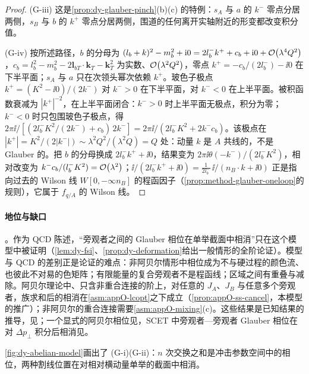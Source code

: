 \begin{proof}
(G-iii) 这是\cref{prop:dy-glauber-pinch}(b)(c) 的特例：$s_A$ 与 $a$ 的 $k^-$ 零点分居两侧，$s_B$ 与 $b$ 的 $k^+$ 零点分居两侧，围道的任何离开实轴附近的形变都改变积分值。

(G-iv) 按所述路径，$b$ 的分母为 $(l_b+k)^2-m_b^2+\mathrm{i}0=2l_b^-k^++c_b+\mathrm{i}0+\mathcal{O}\!\left(\lambda^4Q^2\right)$，$c_b=l_b^2-m_b^2-2\mathbf l_{bT}\cdot\mathbf k_T-\mathbf k_T^2$ 为实数、$\mathcal{O}\!\left(\lambda^2Q^2\right)$，零点 $k^+=-c_b/(2l_b^-)-\ii0$ 在下半平面；$s_A$ 与 $a$ 只在次领头幂次依赖 $k^+$。玻色子极点 $k^+=(K^2-\ii0)/(2k^-)$ 对 $k^->0$ 在下半平面，对 $k^-<0$ 在上半平面。被积函数衰减为 $|k^+|^{-2}$，在上半平面闭合：$k^->0$ 时上半平面无极点，积分为零；$k^-<0$ 时只包围玻色子极点，得 $2\pi\ii/[(2l_b^-K^2/(2k^-)+c_b)\,2k^-]=2\pi\ii/(2l_b^-K^2+2k^-c_b)$。该极点在 $|k^+|=K^2/(2|k^-|)\sim\lambda^2Q^2/(\lambda^2Q)=Q$ 处：动量 $k$ 是 $A$ 共线的，不是 Glauber 的。把 $b$ 的分母换成 $2l_b^-k^++\ii0$，结果变为 $2\pi\ii\theta(-k^-)/(2l_b^-K^2)$，相对改变为 $k^-c_b/(l_b^-K^2)=\mathcal{O}\!\left(\lambda^2\right)$；$\ii/(2l_b^-k^++\ii0)=\frac{1}{2l_b^-}\,\ii/(n_B\cdot k+\ii0)$ 正是指向过去的 Wilson 线 $W[0,-\infty n_B]$ 的程函因子（\cref{prop:method-glauber-oneloop}的规则），它属于 $f_{q/A}$ 的 Wilson 线。
\end{proof}

\paragraph{地位与缺口}\tagP。作为 QCD 陈述，“旁观者之间的 Glauber 相位在单举截面中相消”只在这个模型中被证明（\cref{lem:dy-fsi}、\cref{prop:dy-deformation}给出一般情形的全阶论证）。模型与 QCD 的差别正是论证的难点：非阿贝尔情形中相位成为不与硬过程的颜色流、也彼此不对易的色矩阵；有限能量的复合旁观者不是程函线；区域之间有重叠与减除。阿贝尔理论中、只含非重合连接的阶上，对任意的 $J_A$、$J_B$ 与任意多个旁观者，族求和后的相消在\cref{asm:appO-lcopt}之下成立（\cref{prop:appO-ss-cancel}，本模型的推广）；非阿贝尔的重合连接需要\cref{asm:appO-mixing}(c)。这些结果是已知结果的推导，见\cite[第~14.3~节，式~(14.11)--(14.16)，第~14.3.3--14.3.4~节]{Collins2011}；一个显式的阿贝尔相位见\cite[式~(14)]{AybatSterman2009}，SCET 中旁观者—旁观者 Glauber 相位在对 $\Delta p_\perp$ 积分后相消见\cite[式~(11.12)--(11.13)]{RothsteinStewart2016}。

\cref{fig:dy-abelian-model}画出了 (G-i)(G-ii)：$n$ 次交换之和是冲击参数空间中的相位，两种割线位置在对相对横动量单举的截面中相消。

